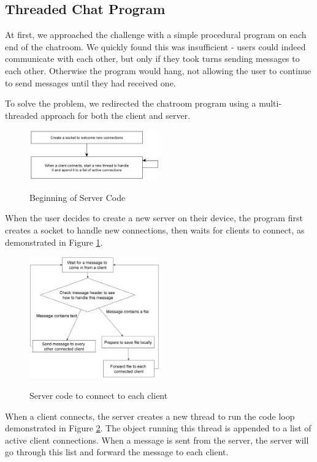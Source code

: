 \documentclass{article}
\begin{document}
\subsection{Threaded Chat Program}

At first, we approached the challenge with a simple procedural program on each end of the chatroom. We quickly found this was insufficient - users could indeed communicate with each other, but only if they took turns sending messages to each other. Otherwise the program would hang, not allowing the user to continue to send messages until they had received one.

To solve the problem, we redirected the chatroom program using a multi-threaded approach for both the client and server.

\begin{figure}[h]
\caption{Beginning of Server Code}
\centering
\includegraphics[width=0.5\textwidth]{media/serverFlowchart2.png}
\label{server2}
\end{figure}

When the user decides to create a new server on their device, the program first creates a socket to handle new connections, then waits for clients to connect, as demonstrated in Figure \ref{server2}.

\begin{figure}[h]
\caption{Server code to connect to each client}
\centering
\includegraphics[width=0.5\textwidth]{media/serverFlowchart1.png}
\label{server1}
\end{figure}

When a client connects, the server creates a new thread to run the code loop demonstrated in Figure \ref{server1}. The object running this thread is appended to a list of active client connections. When a message is sent from the server, the server will go through this list and forward the message to each client.
\end{document}
